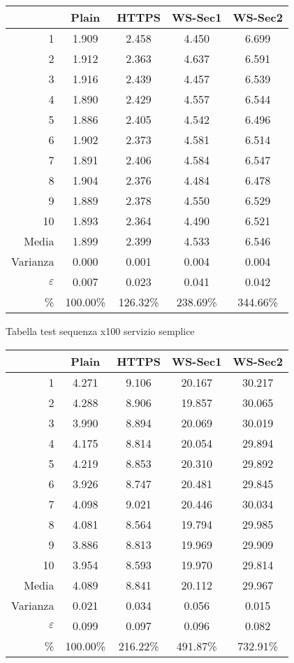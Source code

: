 \begin{small}\begin{longtable}{|r|c|c|c|c|}
\hline\hline
&Plain&HTTPS&WS-Sec1&WS-Sec2\\
\hline\hline
1&1.909&2.458&4.450&6.699\\
\hline
2&1.912&2.363&4.637&6.591\\
\hline
3&1.916&2.439&4.457&6.539\\
\hline
4&1.890&2.429&4.557&6.544\\
\hline
5&1.886&2.405&4.542&6.496\\
\hline
6&1.902&2.373&4.581&6.514\\
\hline
7&1.891&2.406&4.584&6.547\\
\hline
8&1.904&2.376&4.484&6.478\\
\hline
9&1.889&2.378&4.550&6.529\\
\hline
10&1.893&2.364&4.490&6.521\\
\hline\hline
Media&1.899&2.399&4.533&6.546\\
\hline
Varianza&0.000&0.001&0.004&0.004\\
\hline
$\varepsilon$&0.007&0.023&0.041&0.042\\
\hline
\%&100.00\%&126.32\%&238.69\%&344.66\%\\
\hline\hline
\end{longtable}\end{small}

Tabella test sequenza x100 servizio semplice\\

\begin{small}\begin{longtable}{|r|c|c|c|c|}
\hline\hline
&Plain&HTTPS&WS-Sec1&WS-Sec2\\
\hline\hline
1&4.271&9.106&20.167&30.217\\
\hline
2&4.288&8.906&19.857&30.065\\
\hline
3&3.990&8.894&20.069&30.019\\
\hline
4&4.175&8.814&20.054&29.894\\
\hline
5&4.219&8.853&20.310&29.892\\
\hline
6&3.926&8.747&20.481&29.845\\
\hline
7&4.098&9.021&20.446&30.034\\
\hline
8&4.081&8.564&19.794&29.985\\
\hline
9&3.886&8.813&19.969&29.909\\
\hline
10&3.954&8.593&19.970&29.814\\
\hline\hline
Media&4.089&8.841&20.112&29.967\\
\hline
Varianza&0.021&0.034&0.056&0.015\\
\hline
$\varepsilon$&0.099&0.097&0.096&0.082\\
\hline
\%&100.00\%&216.22\%&491.87\%&732.91\%\\
\hline\hline
\end{longtable}\end{small}

